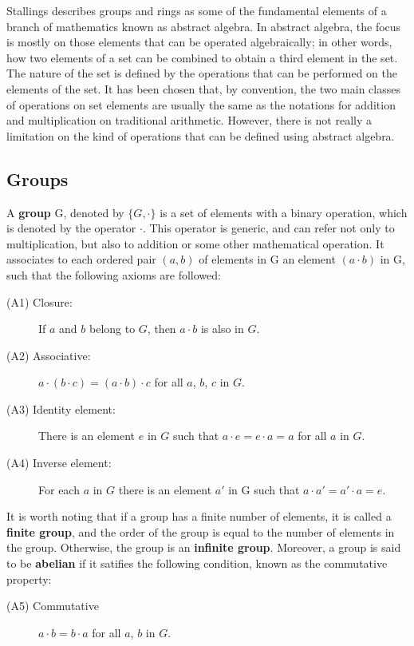 Stallings \cite{CryptoStallings} describes groups and rings as some of the fundamental elements of a branch of mathematics known as abstract algebra. In abstract algebra, the focus is mostly on those elements that can be operated algebraically; in other words, how two elements of a set can be combined to obtain a third element in the set. The nature of the set is defined by the operations that can be performed on the elements of the set. It has been chosen that, by convention, the two main classes of operations on set elements are usually the same as the notations for addition and multiplication on traditional arithmetic. However, there is not really a limitation on the kind of operations that can be defined using abstract algebra.

\subsection{Groups}

A \textbf{group} G, denoted by $\{ G, \cdot \}$ is a set of elements with a binary operation, which is denoted by the operator $\cdot$. This operator is generic, and can refer not only to multiplication, but also to addition or some other mathematical operation. It associates to each ordered pair $(a, b)$ of elements in G an element $(a \cdot b)$ in G, such that the following axioms are followed:
\begin{description}
  \item[(A1) Closure:] If $a$ and $b$ belong to $G$, then $a \cdot b$ is also in $G$.
  \item[(A2) Associative:] $a \cdot (b \cdot c) = (a \cdot b) \cdot c $ for all $a$, $b$, $c$ in $G$.
  \item[(A3) Identity element:] There is an element $e$ in $G$ such that $a \cdot e = e \cdot a = a$ for all $a$ in $G$.
  \item[(A4) Inverse element:] For each $a$ in $G$ there is an element $a'$ in G such that $a \cdot a' = a' \cdot a = e$. 
\end{description}
It is worth noting that if a group has a finite number of elements, it is called a \textbf{finite group}, and the order of the group is equal to the number of elements in the group. Otherwise, the group is an \textbf{infinite group}. Moreover, a group is said to be \textbf{abelian} if it satifies the following condition, known as the commutative property:
\begin{description}
  \item[(A5) Commutative] $a \cdot b = b \cdot a$ for all $a$, $b$ in $G$.
\end{description}

